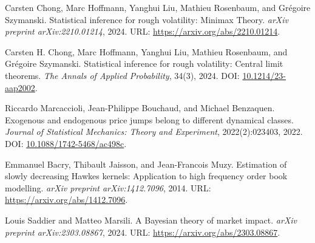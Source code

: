 \documentclass[10pt,a4paper]{article}
\theoremstyle{definition}
\theoremstyle{remark}
\begin{document}
\newpage
\begin{thebibliography}{9}

Carsten Chong, Marc Hoffmann, Yanghui Liu, Mathieu Rosenbaum, and Grégoire Szymanski.
\newblock Statistical inference for rough volatility: Minimax Theory.
\newblock \emph{arXiv preprint arXiv:2210.01214}, 2024.
\newblock URL: \url{https://arxiv.org/abs/2210.01214}.

Carsten H. Chong, Marc Hoffmann, Yanghui Liu, Mathieu Rosenbaum, and Grégoire Szymanski.
\newblock Statistical inference for rough volatility: Central limit theorems.
\newblock \emph{The Annals of Applied Probability}, 34(3), 2024.
\newblock DOI: \href{http://dx.doi.org/10.1214/23-AAP2002}{10.1214/23-aap2002}.

Riccardo Marcaccioli, Jean-Philippe Bouchaud, and Michael Benzaquen.
\newblock Exogenous and endogenous price jumps belong to different dynamical classes.
\newblock \emph{Journal of Statistical Mechanics: Theory and Experiment}, 2022(2):023403, 2022.
\newblock DOI: \href{http://dx.doi.org/10.1088/1742-5468/ac498c}{10.1088/1742-5468/ac498c}.

Emmanuel Bacry, Thibault Jaisson, and Jean-Francois Muzy.
\newblock Estimation of slowly decreasing Hawkes kernels: Application to high frequency order book modelling.
\newblock \emph{arXiv preprint arXiv:1412.7096}, 2014.
\newblock URL: \url{https://arxiv.org/abs/1412.7096}.

Louis Saddier and Matteo Marsili.
\newblock A Bayesian theory of market impact.
\newblock \emph{arXiv preprint arXiv:2303.08867}, 2024.
\newblock URL: \url{https://arxiv.org/abs/2303.08867}.

\end{thebibliography}
\end{document}

